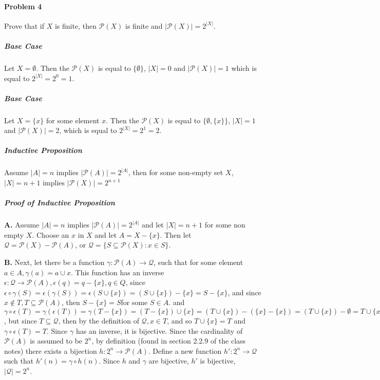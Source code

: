 \documentclass[12pt, letterpaper]{article}
\begin{document}
\paragraph{Problem 4} Prove that if \(X\) is finite, then \(\mathcal{P}(X)\) is finite and \( \left| \mathcal{P}(X) \right| = 2^{\left | X \right |}\).
 
\subparagraph{Base Case}  Let \(X = \emptyset \). Then the \(\mathcal{P}(X)\) is equal to \(\{\emptyset\}\),  \(\left|X\right| = 0\) and \(\left|\mathcal{P}(X)\right| = 1\) which is equal to \(2^{\left| X \right|} = 2^0 = 1\).

\subparagraph{Base Case} Let \(X = \{ x \}\) for some element \(x\). Then the \( \mathcal{P}(X) \) is equal to \( \{ \emptyset, \{x\} \} \),  \( \left| X \right| = 1 \) and \( \left| \mathcal{P}(X) \right| = 2\), which is equal to \(2^{\left| X \right|} = 2^1 = 2\).
\subparagraph{Inductive Proposition} Assume \(\left|A\right| =n \) implies
 \( \left| \mathcal{P}(A) \right| = 2^{\left|A\right|}\), then for some non-empty set \(X\), \( \left|X\right| = n + 1 \)  implies \( \left| \mathcal{P}(X) \right| = 2^{n+1}\)

\subparagraph{Proof of Inductive Proposition} 

\textbf{A.} Assume \(\left|A\right| =n \) implies
 \( \left| \mathcal{P}(A) \right| = 2^{\left|A\right|}\) and let
\( \left|X\right| = n + 1 \) 
for some non empty \(X\). Choose an \(x\) in \(X\) and let \(A = X - \{x\}\). Then let 
\(\mathcal{Q} = \mathcal{P}(X) - \mathcal{P}(A)\), or \(\mathcal{Q} = \{S \subseteq \mathcal{P}(X) :  x \in S \}\). 

\textbf{B.} Next, let there be a function \(\gamma
: \mathcal{P}(A) \rightarrow \mathcal{Q}\), such that for some element \(a \in A, \gamma(a) = a \cup {x}\). 
This function has an inverse \(\epsilon: \mathcal{Q} \rightarrow \mathcal{P}(A), \epsilon(q) = q - \{x\}, q \in Q\), since \(\epsilon \circ \gamma (S) = \epsilon(\gamma(S)) = \epsilon(S \cup \{x\}) = (S \cup \{x\}) - \{x\}= S - \{x\}\), and since \(x \notin T, T \subseteq \mathcal{P}(A)\), then \(S - \{x\} = S\)for some \(S \in A\). 
and \( \gamma \circ \epsilon(T) = \gamma(\epsilon(T)) = \gamma(T-\{x\}) = (T - \{x\}) \cup \{x\} =
 (T \cup \{x\}) - (\{x\} - \{x\}) = (T \cup \{x\}) - \emptyset = T \cup \{x\}\),
  but since \(T \subseteq \mathcal{Q}\), then by the definition of \(\mathcal{Q}, x \in T\), and so \(T \cup \{x\} = T\) and \(\gamma \circ \epsilon(T) = T\). Since \(\gamma\) has an inverse, it is bijective. Since the cardinality of \(\mathcal{P}(A)\) is assumed to be \(2^n\), by definition (found in section 2.2.9 of the class notes) there exists a bijection \(h: \underline{2^n} \rightarrow \mathcal{P}(A)\). Define a new function \(h': \underline{2^n} \rightarrow \mathcal{Q}\) such that \(h'(n)= \gamma \circ h(n)\). Since \(h\) and \(\gamma\) are bijective, \(h'\) is bijective, \(\left|\mathcal{Q}\right| = 2^n\).
 
\end{document}
